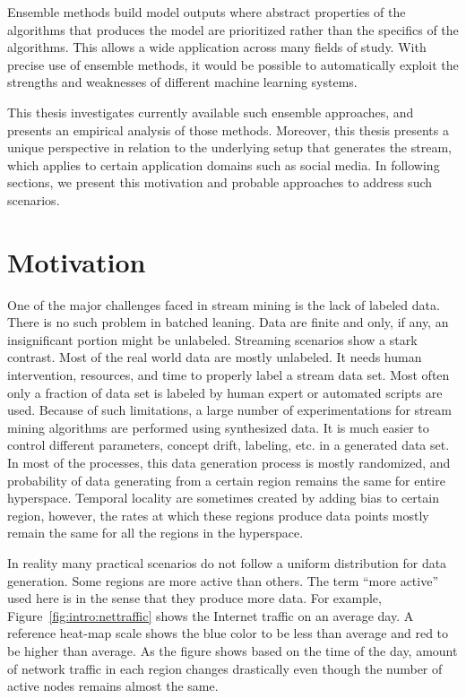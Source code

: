 Ensemble methods build model outputs where abstract properties of the algorithms that produces the model are prioritized rather than the specifics of the algorithms. This allows a wide application across many fields of study. With precise use of ensemble methods, it would be possible to automatically exploit the strengths and weaknesses of different machine learning systems.

This thesis investigates currently available such ensemble approaches, and presents an empirical analysis of those methods. Moreover, this thesis presents a unique perspective in relation to the underlying setup that generates the stream, which applies to certain application domains such as social media. In following sections, we present this motivation and probable approaches to address such scenarios.

\section{Motivation}
\label{sec:intro:motiv}
One of the major challenges faced in stream mining is the lack of labeled data. There is no such problem in batched leaning. Data are finite and only, if any, an insignificant portion might be unlabeled. Streaming scenarios show a stark contrast. Most of the real world data are mostly unlabeled. It needs human intervention, resources, and time to properly label a stream data set. Most often only a fraction of data set is labeled by human expert or automated scripts are used. Because of such limitations, a large number of experimentations for stream mining algorithms are performed using synthesized data. It is much easier to control different parameters, concept drift, labeling, etc. in a generated data set. In most of the processes, this data generation process is mostly randomized, and probability of data generating from a certain region remains the same for entire hyperspace. Temporal locality are sometimes created by adding bias to certain region, however, the rates at which these regions produce data points mostly remain the same for all the regions in the hyperspace.

In reality many practical scenarios do not follow a uniform distribution for data generation. Some regions are more active than others. The term ``more active'' used here is in the sense that they produce more data. For example, Figure~\ref{fig:intro:nettraffic} shows the Internet traffic on an average day. A reference heat-map scale shows the blue color to be less than average and red to be higher than average. As the figure shows based on the time of the day, amount of network traffic in each region changes drastically even though the number of active nodes remains almost the same.

